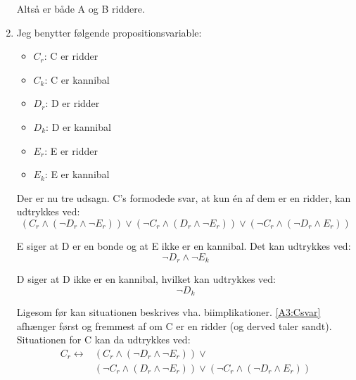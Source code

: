 \begin{enumerate}
  Altså er både A og B riddere.

  \item
  Jeg benytter følgende propositionsvariable:
  \begin{itemize}
    \item $C_r$: C er ridder
    \item $C_k$: C er kannibal
    \item $D_r$: D er ridder
    \item $D_k$: D er kannibal
    \item $E_r$: E er ridder
    \item $E_k$: E er kannibal
  \end{itemize}

  Der er nu tre udsagn. C's formodede svar, at kun én af dem er en ridder, kan udtrykkes ved:
  \begin{equation}
    \label{A3:Csvar}
    \left( C_r \land \left( \lnot D_r \land \lnot E_r \right) \right) \lor \left( \lnot C_r \land \left( D_r \land \lnot E_r \right) \right) \lor \left( \lnot C_r \land \left( \lnot D_r \land E_r \right) \right)
  \end{equation}

  E siger at D er en bonde og at E ikke er en kannibal. Det kan udtrykkes ved:
  \begin{equation}
    \label{A3:Esvar}
    \lnot D_r \land \lnot E_k
  \end{equation}

  D siger at D ikke er en kannibal, hvilket kan udtrykkes ved:
  \begin{equation}
    \label{A3:Dsvar}
    \lnot D_k
  \end{equation}

  Ligesom før kan situationen beskrives vha. biimplikationer. \eqref{A3:Csvar} afhænger først og fremmest af om C er en ridder (og derved taler sandt). Situationen for C kan da udtrykkes ved:
  \begin{equation}
    \label{A3:Csituation}
    \begin{split}
      C_r \leftrightarrow & \left( C_r \land \left( \lnot D_r \land \lnot E_r \right) \right) \lor\\
      & \left( \lnot C_r \land \left( D_r \land \lnot E_r \right) \right) \lor \left( \lnot C_r \land \left( \lnot D_r \land E_r \right) \right)
    \end{split}
  \end{equation}


\end{enumerate}
